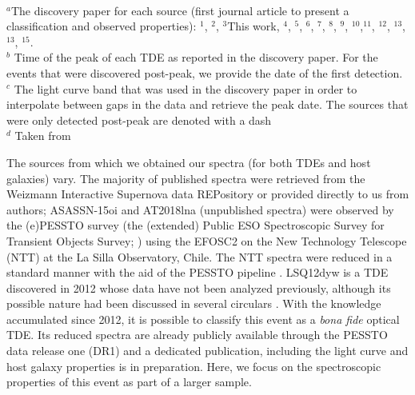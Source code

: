 \documentclass[structabstract]{aa}
\begin{document}
\begin{table*}
\begin{center}
\\[-10pt]
\end{center}
$^{a}$The discovery paper for each source (first journal article to present a classification and observed properties): $^1$\citet{Arcavi2014}, $^2$\citet{Gezari2012}, $^3$This work, $^4$\citet{Holoien2014}, 
$^5$\citet{Miller2015}, $^6$\citet{Blagorodnova2018}, $^7$\citet{Holoien2015}, $^8$\citet{Hung2017}, $^{9}$\citet{Blagorodnova2017},
$^{10}$\citet{Nicholl2019},$^{11}$\citet{Holoien2018}, $^{12}$\citet{Leloudas2019}, $^{13}$\citet{Wevers2019}, $^{13}$\citet{Short2020a}, $^{15}$\citet{vanvelzen2021}. \\
$^{b}$ Time of the peak of each TDE as reported in the discovery paper. For the events that were discovered post-peak, we provide the date of the first detection. \\
$^{c}$ The light curve band that was used in the discovery paper in order to interpolate between gaps in the data and retrieve the peak date. The sources that were only detected post-peak are denoted with a dash\\
$^{d}$ Taken from \citet{gomez1925}
\end{table*}


The sources from which we obtained our spectra (for both TDEs and host galaxies) vary. The majority of published spectra were retrieved from the Weizmann Interactive Supernova data REPository \citep[WISeREP\footnote{\url{http://www.weizmann.ac.il/astrophysics/wiserep}};][]{Yaron2012} or provided directly to us from authors; ASASSN-15oi and AT2018lna (unpublished spectra) were observed by the (e)PESSTO survey (the (extended) Public ESO Spectroscopic Survey for Transient Objects Survey; \citealt{Smartt2014}) using the EFOSC2 on the New Technology Telescope (NTT) at the La Silla Observatory, Chile. The NTT spectra were reduced in a standard manner with the aid of the PESSTO pipeline \citep{Smartt2014}. LSQ12dyw is a TDE discovered in 2012 whose data have not been analyzed previously, although its possible nature had been discussed in several circulars \citep{Smartt2012,12dyw2,12dyw3}.
With the knowledge accumulated since 2012, it is possible to classify this event as a \textit{bona fide} optical TDE. Its reduced spectra are already publicly available through the PESSTO data release one (DR1) and a dedicated publication, including the light curve and host galaxy properties is in preparation. Here, we focus on the spectroscopic properties of this event as part of a larger sample. 
 
\end{document}
